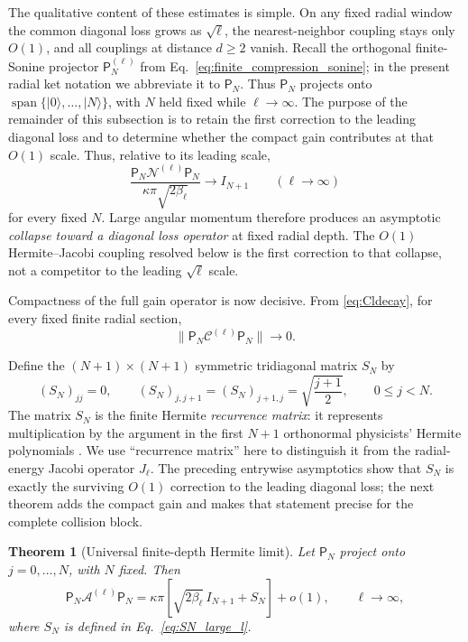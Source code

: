 \documentclass[11pt]{article}
\numberwithin{equation}{section}
\newtheorem{theorem}{Theorem}[section]
\theoremstyle{definition}
\begin{document}
The qualitative content of these estimates is simple.  On any fixed radial
window the common diagonal loss grows as $\sqrt{\ell}$, the nearest-neighbor
coupling stays only $O(1)$, and all couplings at distance $d\ge2$ vanish.
Recall the orthogonal finite-Sonine projector $\mathsf P_N^{(\ell)}$ from
Eq.~\eqref{eq:finite_compression_sonine}; in the present radial ket notation we
abbreviate it to $\mathsf P_N$.  Thus $\mathsf P_N$ projects onto
$\operatorname{span}\{|0\rangle,\ldots,|N\rangle\}$, with $N$ held fixed while
$\ell\to\infty$.  The purpose of the remainder of this subsection is to retain
the first correction to the leading diagonal loss and to determine whether the
compact gain contributes at that $O(1)$ scale.
Thus, relative to its leading scale,
\begin{equation}
 \frac{\mathsf P_N\mathcal N^{(\ell)}\mathsf P_N}
 {\kappa\pi\sqrt{2\beta_\ell}}
 \longrightarrow I_{N+1}
 \qquad(\ell\to\infty)
 \label{eq:large_l_relative_diagonalization}
\end{equation}
for every fixed $N$.  Large angular momentum therefore produces an
asymptotic \emph{collapse toward a diagonal loss operator} at fixed radial
depth.  The $O(1)$ Hermite--Jacobi coupling resolved below is the first
correction to that collapse, not a competitor to the leading $\sqrt\ell$
scale.

Compactness of the full gain operator is now decisive.  From
\eqref{eq:Cldecay}, for every fixed finite radial section,
\begin{equation}
 \|\mathsf P_N\mathcal C^{(\ell)}\mathsf P_N\|\to0.
\end{equation}

Define the $(N+1)\times(N+1)$ symmetric tridiagonal matrix $S_N$ by
\begin{equation}
 (S_N)_{jj}=0,
 \qquad
 (S_N)_{j,j+1}=(S_N)_{j+1,j}
 =\sqrt{\frac{j+1}{2}},
 \qquad 0\le j<N.
 \label{eq:SN_large_l}
\end{equation}
The matrix $S_N$ is the finite Hermite \emph{recurrence matrix}: it represents
multiplication by the argument in the first $N+1$ orthonormal physicists'
Hermite polynomials \cite{Chihara1978}.  We use ``recurrence matrix'' here to
distinguish it from the radial-energy Jacobi operator $J_\ell$.  The preceding
entrywise asymptotics show that $S_N$ is exactly the surviving $O(1)$ correction
to the leading diagonal loss; the next theorem adds the compact gain and makes
that statement precise for the complete collision block.

\begin{theorem}[Universal finite-depth Hermite limit]
Let $\mathsf P_N$ project onto $j=0,\ldots,N$, with $N$ fixed.  Then
\begin{equation}
 \boxed{
 \mathsf P_N\mathcal A^{(\ell)}\mathsf P_N
 =
 \kappa\pi
 \left[
 \sqrt{2\beta_\ell}\,I_{N+1}+S_N
 \right]
 +o(1),
 \qquad
 \ell\to\infty,
 }
 \label{eq:Hermite_limit}
\end{equation}
where $S_N$ is defined in Eq.~\eqref{eq:SN_large_l}.
\end{theorem}
\end{document}
